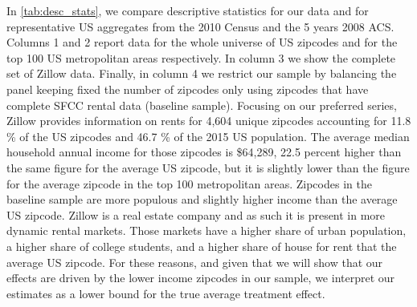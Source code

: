 In \autoref{tab:desc_stats}, we compare descriptive statistics for our data and for representative 
US aggregates from the 2010 Census and the 5 years 2008 ACS. Columns 1 and 2 report data for the 
whole universe of US zipcodes and for the top 100 US metropolitan areas respectively. In column 3 
we show the complete set of Zillow data. Finally, in column 4 we restrict our sample by balancing 
the panel keeping fixed the number of zipcodes only using zipcodes that have complete SFCC rental 
data (baseline sample). Focusing on our preferred series, Zillow provides information on rents for 
4,604 unique zipcodes accounting for 11.8 \% of the US zipcodes and 46.7 \% of the 2015 US population. The average median household annual income for those zipcodes is \$64,289, 22.5 percent higher than 
the same figure for the average US zipcode, but it is slightly lower than the figure for the average 
zipcode in the top 100 metropolitan areas. Zipcodes in the baseline sample are more populous and 
slightly higher income than the average US zipcode. Zillow is a real estate company and as such it 
is present in more dynamic rental markets. Those markets have a higher share of urban population, a 
higher share of college students, and a higher share of house for rent that the average US zipcode. 
For these reasons, and given that we will show that our effects are driven by the lower income 
zipcodes in our sample, we interpret our estimates as a lower bound for the true average treatment 
effect.

